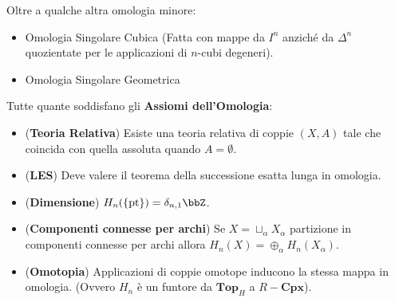 \documentclass[a4paper,NoNotes,GeneralMath]{stdmdoc}
\newcommand{\Top}{\textbf{Top}}
\newcommand{\Cpx}{\textbf{Cpx}}
\begin{document}
Oltre a qualche altra omologia minore:
\begin{itemize}
\item Omologia Singolare Cubica (Fatta con mappe da $I^n$ anziché da $\Delta^n$ quozientate per le applicazioni di $n$-cubi degeneri).
\item Omologia Singolare Geometrica \dotfill
\end{itemize}

Tutte quante soddisfano gli {\bf Assiomi dell'Omologia}:
\begin{itemize}
\item ({\bf Teoria Relativa}) Esiste una teoria relativa di coppie $(X, A)$ tale che coincida con quella assoluta quando $A = \emptyset$.
\item ({\bf LES}) Deve valere il teorema della successione esatta lunga in omologia.
\item ({\bf Dimensione}) $H_n(\lrg{\text{pt}}) = \delta_{n,1} \bbZ$.
\item ({\bf Componenti connesse per archi}) Se $X = \sqcup_\alpha X_\alpha$ partizione in componenti connesse per archi allora $H_n(X) = \oplus_\alpha H_n(X_\alpha)$.
\item ({\bf Omotopia}) Applicazioni di coppie omotope inducono la stessa mappa in omologia. (Ovvero $H_n$ è un funtore da $\Top_H$ a $R-\Cpx$).
\end{itemize}
\end{document}
